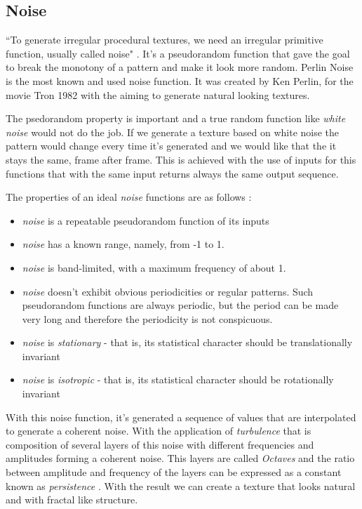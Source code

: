 
\subsection{Noise} %
\label{ssub:noise}


``To generate irregular procedural textures, we need an irregular primitive function, usually called noise" \cite{Ebert2002}. It's a pseudorandom function that gave the goal to break the monotony of a pattern and make it look more random.
Perlin Noise is the most known and used noise function. It was created by Ken Perlin, for the movie Tron 1982 with the aiming to generate natural looking textures.

The psedorandom property is important and a true random function like \emph{white noise} would not do the job. If we generate a texture based on white noise the pattern would change every time it's generated and we would like that the it stays the same, frame after frame. This is achieved with the use of inputs for this functions that with the same input returns always the same output sequence. 

The properties of an ideal \emph{noise} functions are as follows \cite{Ebert2002}:
\begin{itemize}
	\item \emph{noise} is a repeatable pseudorandom function of its inputs
	\item \emph{noise} has a known range, namely, from -1 to 1.
	\item \emph{noise} is band-limited, with a maximum frequency of about 1.
	\item \emph{noise} doesn't exhibit obvious periodicities or regular patterns. Such pseudorandom functions are always periodic, but the period can be made very long and therefore the periodicity is not conspicuous.
	\item \emph{noise} is \emph{stationary} - that is, its statistical character should be translationally invariant
	\item \emph{noise} is \emph{isotropic} - that is, its statistical character should be rotationally invariant
\end{itemize}

With this noise function, it's generated a sequence of values that are interpolated to generate a coherent noise. With the application of \emph{turbulence} that is composition of several layers of this noise with different frequencies and amplitudes forming a coherent noise. This layers are called \emph{Octaves} and the ratio between amplitude and frequency of the layers can be expressed as a constant known as \emph{persistence} \cite{Kelly2008}. With the result we can create a texture that looks natural and with fractal like structure.

